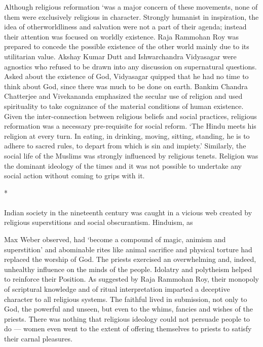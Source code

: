 Although religious reformation `was a major concern of these movements, none of them were exclusively religious in character. Strongly humanist in inspiration, the idea of otherworldliness and salvation were not a part of their agenda; instead their attention was focused on worldly existence. Raja Rammohan Roy was prepared to concede the possible existence of the other world mainly due to its utilitarian value. Akshay Kumar Dutt and Ishwarchandra Vidyasagar were agnostics who refused to be drawn into any discussion on supernatural questions. Asked about the existence of God, Vidyasagar quipped that he had no time to think about God, since there was much to be done on earth. Bankim Chandra Chatterjee and Vivekananda emphasized the secular use of religion and used spirituality to take cognizance of the material conditions of human existence. Given the inter-connection between religious beliefs and social practices, religious reformation was a necessary pre-requisite for social reform. `The Hindu meets his religion at every turn. In eating, in drinking, moving, sitting, standing, he is to adhere to sacred rules, to depart from which is sin and impiety.' Similarly, the social life of the Muslims was strongly influenced by religious tenets. Religion was the dominant ideology of the times and it was not possible to undertake any social action without coming to grips with it.

\begin{center}*\end{center}

\paragraph*{}


Indian society in the nineteenth century was caught in a vicious web created by religious superstitions and social obscurantism. Hinduism, as

Max Weber observed, had `become a compound of magic, animism and superstition' and abominable rites like animal sacrifice and physical torture had replaced the worship of God. The priests exercised an overwhelming and, indeed, unhealthy influence on the minds of the people. Idolatry and polytheism helped to reinforce their Position. As suggested by Raja Rammohan Roy, their monopoly of scriptural knowledge and of ritual interpretation imparted a deceptive character to all religious systems. The faithful lived in submission, not only to God, the powerful and unseen, but even to the whims, fancies and wishes of the priests. There was nothing that religious ideology could not persuade people to do — women even went to the extent of offering themselves to priests to satisfy their carnal pleasures.

